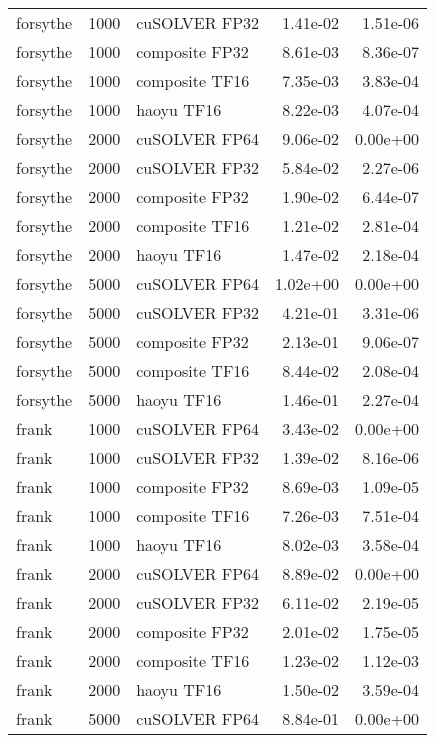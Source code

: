 \begin{table}
\begin{tabular}{lrlrr}
 forsythe &  1000 &  cuSOLVER FP32 &  1.41e-02 &        1.51e-06 \\
 forsythe &  1000 & composite FP32 &  8.61e-03 &        8.36e-07 \\
 forsythe &  1000 & composite TF16 &  7.35e-03 &        3.83e-04 \\
 forsythe &  1000 &     haoyu TF16 &  8.22e-03 &        4.07e-04 \\
 forsythe &  2000 &  cuSOLVER FP64 &  9.06e-02 &        0.00e+00 \\
 forsythe &  2000 &  cuSOLVER FP32 &  5.84e-02 &        2.27e-06 \\
 forsythe &  2000 & composite FP32 &  1.90e-02 &        6.44e-07 \\
 forsythe &  2000 & composite TF16 &  1.21e-02 &        2.81e-04 \\
 forsythe &  2000 &     haoyu TF16 &  1.47e-02 &        2.18e-04 \\
 forsythe &  5000 &  cuSOLVER FP64 &  1.02e+00 &        0.00e+00 \\
 forsythe &  5000 &  cuSOLVER FP32 &  4.21e-01 &        3.31e-06 \\
 forsythe &  5000 & composite FP32 &  2.13e-01 &        9.06e-07 \\
 forsythe &  5000 & composite TF16 &  8.44e-02 &        2.08e-04 \\
 forsythe &  5000 &     haoyu TF16 &  1.46e-01 &        2.27e-04 \\
    frank &  1000 &  cuSOLVER FP64 &  3.43e-02 &        0.00e+00 \\
    frank &  1000 &  cuSOLVER FP32 &  1.39e-02 &        8.16e-06 \\
    frank &  1000 & composite FP32 &  8.69e-03 &        1.09e-05 \\
    frank &  1000 & composite TF16 &  7.26e-03 &        7.51e-04 \\
    frank &  1000 &     haoyu TF16 &  8.02e-03 &        3.58e-04 \\
    frank &  2000 &  cuSOLVER FP64 &  8.89e-02 &        0.00e+00 \\
    frank &  2000 &  cuSOLVER FP32 &  6.11e-02 &        2.19e-05 \\
    frank &  2000 & composite FP32 &  2.01e-02 &        1.75e-05 \\
    frank &  2000 & composite TF16 &  1.23e-02 &        1.12e-03 \\
    frank &  2000 &     haoyu TF16 &  1.50e-02 &        3.59e-04 \\
    frank &  5000 &  cuSOLVER FP64 &  8.84e-01 &        0.00e+00 \\

\end{tabular}
\end{table}
